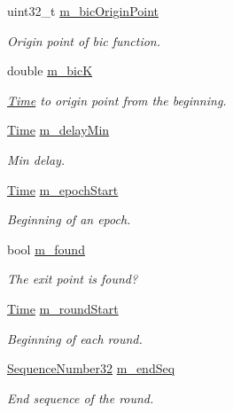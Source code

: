 \begin{DoxyCompactItemize}
uint32\+\_\+t \hyperlink{classns3_1_1TcpCubic_a10fb71cdb4155d6e61174690e6bc295a}{m\+\_\+bic\+Origin\+Point}
\begin{DoxyCompactList}\small\item\em Origin point of bic function. \end{DoxyCompactList}\item 
double \hyperlink{classns3_1_1TcpCubic_a2eb43ad263dbf87c343bbdaeea7eefc7}{m\+\_\+bicK}
\begin{DoxyCompactList}\small\item\em \hyperlink{classns3_1_1Time}{Time} to origin point from the beginning. \end{DoxyCompactList}\item 
\hyperlink{classns3_1_1Time}{Time} \hyperlink{classns3_1_1TcpCubic_a97143c4377ca57cac3095206a85e8db0}{m\+\_\+delay\+Min}
\begin{DoxyCompactList}\small\item\em Min delay. \end{DoxyCompactList}\item 
\hyperlink{classns3_1_1Time}{Time} \hyperlink{classns3_1_1TcpCubic_aa93581f58a0b6e113d533eda3f86b9a7}{m\+\_\+epoch\+Start}
\begin{DoxyCompactList}\small\item\em Beginning of an epoch. \end{DoxyCompactList}\item 
bool \hyperlink{classns3_1_1TcpCubic_a63fac9018c36941b4bbc5d5f20f21abf}{m\+\_\+found}
\begin{DoxyCompactList}\small\item\em The exit point is found? \end{DoxyCompactList}\item 
\hyperlink{classns3_1_1Time}{Time} \hyperlink{classns3_1_1TcpCubic_a9c55defdbfe7bb3e12c6dedaece70434}{m\+\_\+round\+Start}
\begin{DoxyCompactList}\small\item\em Beginning of each round. \end{DoxyCompactList}\item 
\hyperlink{group__network_gacb2070e4e98d2d5135c9bede58f07a03}{Sequence\+Number32} \hyperlink{classns3_1_1TcpCubic_a68e4f286739c0436737028bda53f1a48}{m\+\_\+end\+Seq}
\begin{DoxyCompactList}\small\item\em End sequence of the round. \end{DoxyCompactList}\item 

\end{DoxyCompactItemize}
